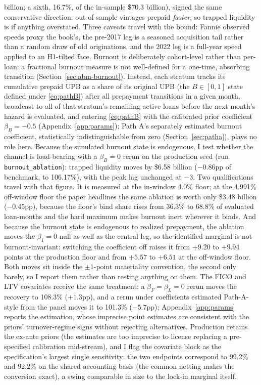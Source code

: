 \documentclass[12pt]{article}
\begin{document}
billion; a sixth, 16.7\%, of the in-sample \$70.3 billion), signed the same conservative direction: out-of-sample vintages prepaid \emph{faster}, so trapped liquidity is if anything overstated. Three caveats travel with the bound: Fannie observed speeds proxy the book's, the pre-2017 leg is a seasoned acquisition tail rather than a random draw of old originations, and the 2022 leg is a full-year speed applied to an H1-tilted face. Burnout is deliberately cohort-level rather than per-loan: a fractional burnout measure is not well-defined for a one-time, absorbing transition (Section~\ref{sec:abm-burnout}). Instead, each stratum tracks its cumulative prepaid UPB as a share of its original UPB (the $B \in [0,1]$ state defined under \eqref{eq:pathB}) after all prepayment transitions in a given month, broadcast to all of that stratum's remaining active loans before the next month's hazard is evaluated, and entering \eqref{eq:pathB} with the calibrated prior coefficient $\beta_B = -0.5$ (Appendix~\ref{app:params}); Path A's separately estimated burnout coefficient, statistically indistinguishable from zero (Section~\ref{sec:patha}), plays no role here. Because the simulated burnout state is endogenous, I test whether the channel is load-bearing with a $\beta_B = 0$ rerun on the production seed (run \texttt{burnout\_ablation}): trapped liquidity moves by \$6.58 billion ($-0.86$pp of benchmark, to 106.17\%), with the peak lag unchanged at $-3$. Two qualifications travel with that figure. It is measured at the in-window 4.0\% floor; at the 4.991\% off-window floor the paper headlines the same ablation is worth only \$3.48 billion ($-0.45$pp), because the floor's bind share rises from 36.3\% to 68.8\% of evaluated loan-months and the hard maximum makes burnout inert wherever it binds. And because the burnout state is endogenous to realized prepayment, the ablation moves the $\beta_1 = 0$ null as well as the central leg, so the identified marginal is not burnout-invariant: switching the coefficient off raises it from $+9.20$ to $+9.94$ points at the production floor and from $+5.57$ to $+6.51$ at the off-window floor. Both moves sit inside the $\pm 1$-point materiality convention, the second only barely, so I report them rather than resting anything on them. The FICO and LTV covariates receive the same treatment: a $\beta_F = \beta_L = 0$ rerun moves the recovery to 108.3\% ($+1.3$pp), and a rerun under coefficients estimated Path-A-style from the panel moves it to 101.3\% ($-5.7$pp); Appendix~\ref{app:params} reports the estimation, whose imprecise point estimates are consistent with the priors' turnover-regime signs without rejecting alternatives. Production retains the ex-ante priors (the estimates are too imprecise to license replacing a pre-specified calibration mid-stream), and I flag the covariate block as the specification's largest single sensitivity: the two endpoints correspond to 99.2\% and 92.2\% on the shared accounting basis (the common netting makes the conversion exact), a swing comparable in size to the lock-in marginal itself.
\end{document}
